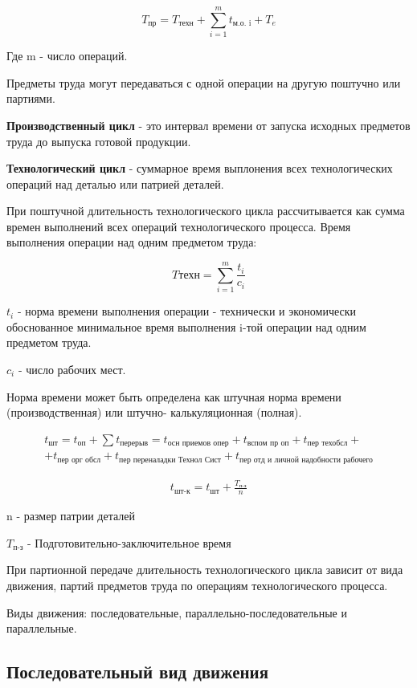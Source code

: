 \documentclass[14pt,a4paper,oneside]{extarticle}
\begin{document}
\[T_\text{пр}=T_\text{техн}+\sum_{i=1}^m t_\text{м.о. i}+T_e\]

Где m - число операций.

Предметы труда могут передаваться с одной операции на другую поштучно или партиями.

\textbf{Производственный цикл} - это интервал времени от запуска исходных предметов труда до выпуска готовой продукции.

\textbf{Технологический цикл} - суммарное время выплонения всех технологических операций над деталью или патрией деталей.

При поштучной длительность технологического цикла рассчитывается как сумма времен выполнений всех операций технологического процесса. Время выполнения операции над одним предметом труда:

\[T\text{техн}=\sum_{i=1}^{m}\frac{t_i}{c_i}\]

$t_i$ - норма времени выполнения операции - технически и экономически обоснованное минимальное время выполнения i-той операции над одним предметом труда.

$c_i$ - число рабочих мест.

Норма времени может быть определена как штучная норма времени (производственная) или штучно- калькуляционная (полная).

\begin{gather*}
        t_\text{шт}=t_\text{оп}+\sum t_\text{перерыв}=t_\text{осн приемов опер}+t_\text{вспом пр оп}+ t_\text{пер техобсл}+\\+t_\text{пер орг обсл}+t_\text{пер переналадки Технол Сист}+t_\text{пер отд и личной надобности рабочего}
\end{gather*}

\begin{gather*}
    t_\text{шт-к}=t_\text{шт}+\frac{T_\text{п-з}}{n}
\end{gather*}

n - размер патрии деталей

$T_\text{п-з}$ - Подготовительно-заключительное время

При партионной передаче длительность технологического цикла зависит от вида движения, партий предметов труда по операциям технологического процесса.

Виды движения: последовательные, параллельно-последовательные и параллельные.

\subsection{Последовательный вид движения}
\end{document}
